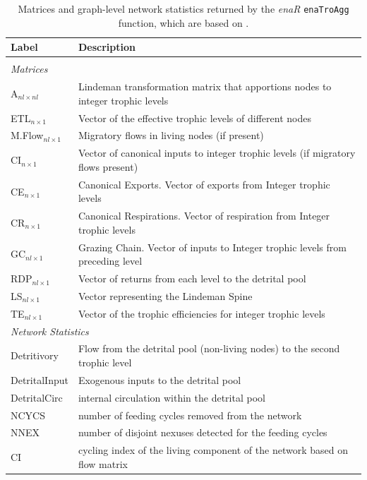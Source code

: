 \documentclass[article]{jss}
\begin{document}
 \begin{table}[t]
  \caption{Matrices and graph-level network statistics returned by the \textit{enaR}
    \texttt{enaTroAgg} function, which are based on \citet{ulanowicz1979trophic}.}\label{tab:trophic}
  \center
  \begin{small}
    \begin{tabular}{l p{10 cm}}
      \textbf{Label} & \textbf{Description} \\ \hline \\[-1.5ex]
      \multicolumn{2}{l}{\textit{Matrices}} \\[1ex]
      A$_{nl \times nl}$ & Lindeman transformation matrix that apportions nodes to integer trophic levels \\  %
      ETL$_{n \times 1}$ & Vector of the effective trophic levels of different nodes \\
      M.Flow$_{nl \times 1}$ & Migratory flows in living nodes (if present) \\
      CI$_{n \times 1}$ & Vector of canonical inputs to integer trophic levels (if migratory flows present) \\
      CE$_{n \times 1}$ & Canonical Exports. Vector of exports from Integer trophic levels \\
      CR$_{n \times 1}$ & Canonical Respirations. Vector of respiration from Integer trophic levels \\
      GC$_{nl \times 1}$ & Grazing Chain. Vector of inputs to Integer trophic levels from preceding level \\
      RDP$_{nl \times 1}$ & Vector of returns from each level to the detrital pool \\
      LS$_{nl \times 1}$ & Vector representing the Lindeman Spine \\
      TE$_{nl \times 1}$ & Vector of the trophic efficiencies for integer trophic levels\\[1ex]
      \multicolumn{2}{l}{\textit{Network Statistics}} \\[1ex]
      Detritivory & Flow from the detrital pool (non-living nodes) to the second trophic level \\
      DetritalInput & Exogenous inputs to the detrital pool \\
      DetritalCirc & internal circulation within the detrital pool \\
      NCYCS & number of feeding cycles removed from the network \\
      NNEX & number of disjoint nexuses detected for the feeding cycles \\
      CI & cycling index of the living component of the network based on flow matrix\\ \hline
\end{tabular}
\end{small}
\end{table}
\end{document}
